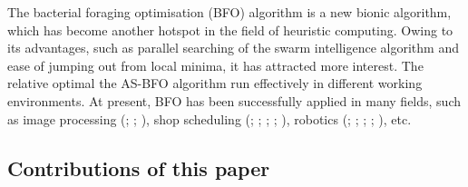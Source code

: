 \documentclass{PDS}%
\theoremstyle{definition}
\begin{document}
The bacterial foraging optimisation (BFO) algorithm is a new bionic algorithm, which has become another hotspot in the field of heuristic
computing. Owing to its advantages, such as parallel searching of the swarm intelligence algorithm
and ease of jumping out from local minima, it has attracted more interest. The relative optimal the AS-BFO algorithm
run effectively in different working environments. At present,
BFO has been successfully applied in many fields, such as image processing
(\citealp{r22}; \citealp{r23}; \citealp{r24}), shop scheduling (\citealp{r25}; \citealp{r28}; \citealp{r27}; \citealp{r26}; \citealp{r29}), robotics (\citealp{r32}; \citealp{r31}; \citealp{r33}; \citealp{r30}; \citealp{r34}), etc.

\subsection{Contributions of this paper}
\end{document}

